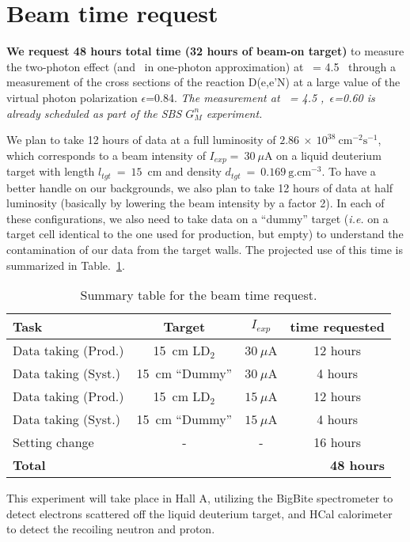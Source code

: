 \section{Beam time request}

{\bf We request 48 hours total time (32 hours of beam-on target)} to measure the two-photon effect (and \gen~in one-photon approximation) 
at \qsq~= 4.5 \gevcsq~through a measurement of the cross sections of the reaction D(e,e'N) at a large value of the virtual photon polarization $\epsilon$=0.84.
{\em The measurement at \qsq~= 4.5 \gevcsq,~$\epsilon$=0.60 is already scheduled as part of the SBS $G_M^n$ experiment.}

We plan to take 12 hours of data at a full luminosity of $2.86~\times~10^{38}~\mathrm{cm}^{-2}\mathrm{s}^{-1}$, which corresponds to a beam intensity of $I_{exp} =~30~\mu$A on a liquid deuterium target with length $l_{tgt}~=~15$~cm and density $d_{tgt}~=~0.169~\mathrm{g.cm}^{-3}$. 
To have a better handle on our backgrounds, we also plan to take 12 hours of data at half luminosity (basically by lowering the beam intensity by a factor 2).
In each of these configurations, we also need to take data on a ``dummy'' target ({\it i.e.} on a target cell identical to the one used for production, but empty) to understand the contamination of our data from the target walls. 
The projected use of this time is summarized in Table.~\ref{tab:beamtime}.
%
\begin{center}
\begin{table}[h]
\begin{tabular}{|l|c|c|c|}
\hline
Task & Target & $I_{exp}$ & time requested \\
\hline
Data taking (Prod.) & 15~cm LD$_2$ & $30~\mu$A & 12 hours \\ 
\hline
Data taking (Syst.) & 15~cm ``Dummy'' & $30~\mu$A & 4 hours \\ 
\hline
Data taking (Prod.) & 15~cm LD$_2$ & $15~\mu$A & 12 hours \\ 
\hline
Data taking (Syst.) & 15~cm ``Dummy'' & $15~\mu$A & 4 hours \\ 
\hline
Setting change & - & - & 16 hours \\
\hline
\hline
{\bf Total} & \multicolumn{3}{r|}{\bf 48 hours} \\
\hline
\end{tabular} 
\caption{Summary table for the beam time request.}%
\label{tab:beamtime}
\end{table}
\end{center}
%
This experiment will take place in Hall A, utilizing the BigBite spectrometer to detect electrons scattered off 
the liquid deuterium target, and HCal calorimeter to detect the recoiling neutron and proton.

